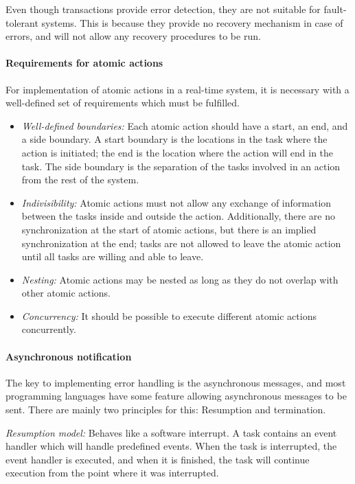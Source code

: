Even though transactions provide error detection, they are not suitable for fault-tolerant systems. This is because they provide no recovery mechanism in case of errors, and will not allow any recovery procedures to be run.

\paragraph{Requirements for atomic actions} For implementation of atomic actions in a real-time system, it is necessary with a well-defined set of requirements which must be fulfilled.
\begin{itemize}
  \item \textit{Well-defined boundaries:} Each atomic action should have a start, an end, and a side boundary. A start boundary is the locations in the task where the action is initiated; the end is the location where the action will end in the task. The side boundary is the separation of the tasks involved in an action from the rest of the system.
  \item \textit{Indivisibility:} Atomic actions must not allow any exchange of information between the tasks inside and outside the action. Additionally, there are no synchronization at the start of atomic actions, but there is an implied synchronization at the end; tasks are not allowed to leave the atomic action until all tasks are willing and able to leave.
  \item \textit{Nesting:} Atomic actions may be nested as long as they do not overlap with other atomic actions.
  \item \textit{Concurrency:} It should be possible to execute different atomic actions concurrently.
\end{itemize}

\paragraph{Asynchronous notification} The key to implementing error handling is the asynchronous messages, and most programming languages have some feature allowing asynchronous messages to be sent. There are mainly two principles for this: Resumption and termination.

\textit{Resumption model:} Behaves like a software interrupt. A task contains an event handler which will handle predefined events. When the task is interrupted, the event handler is executed, and when it is finished, the task will continue execution from the point where it was interrupted.

